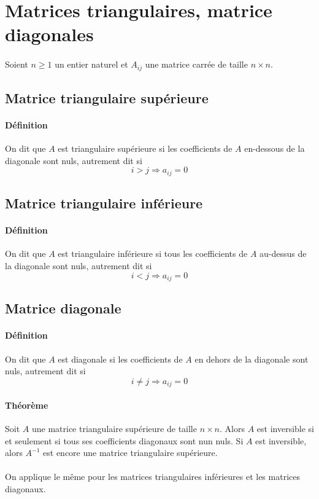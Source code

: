 %
%
\section{Matrices triangulaires, matrice diagonales}
%
%
\paragraph{} Soient $n \geq 1$ un entier naturel et $A_{i j}$ une matrice carrée de taille $n\times n$.

%
\subsection{Matrice triangulaire supérieure}
%
\paragraph{Définition} On dit que $A$ est triangulaire supérieure si les coefficients de $A$ en-dessous de la diagonale sont nuls, autrement dit si 
$$i > j \Rightarrow a_{ij} = 0$$

%
\subsection{Matrice triangulaire inférieure}
%
\paragraph{Définition} On dit que $A$ est triangulaire inférieure si tous les coefficients de $A$ au-dessus de la diagonale sont nuls, autrement dit si 
$$i < j \Rightarrow a_{ij} = 0$$

%
\subsection{Matrice diagonale}
%
\paragraph{Définition} On dit que $A$ est diagonale si les coefficients de $A$ en dehors de la diagonale sont nuls, autrement dit si 
$$i\neq j \Rightarrow a_{ij} = 0$$

\paragraph{Théorème} Soit $A$ une matrice triangulaire supérieure de taille $n\times n$. Alors $A$ est inversible si et seulement si tous ses coefficients diagonaux sont nun nuls. Si $A$ est inversible, alors $A^{-1}$ est encore une matrice triangulaire supérieure.
\\\\
On applique le même pour les matrices triangulaires inférieures et les matrices diagonaux.

